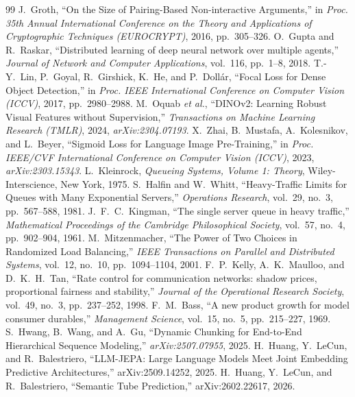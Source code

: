 \documentclass[11pt,a4paper]{article}
\begin{document}
\begin{thebibliography}{99}
 J.~Groth, ``On the Size of Pairing-Based Non-interactive Arguments,'' in \textit{Proc. 35th Annual International Conference on the Theory and Applications of Cryptographic Techniques (EUROCRYPT)}, 2016, pp.~305--326.
 O.~Gupta and R.~Raskar, ``Distributed learning of deep neural network over multiple agents,'' \textit{Journal of Network and Computer Applications}, vol.~116, pp.~1--8, 2018.
 T.-Y.~Lin, P.~Goyal, R.~Girshick, K.~He, and P.~Doll\'ar, ``Focal Loss for Dense Object Detection,'' in \textit{Proc. IEEE International Conference on Computer Vision (ICCV)}, 2017, pp.~2980--2988.
 M.~Oquab \textit{et al.}, ``DINOv2: Learning Robust Visual Features without Supervision,'' \textit{Transactions on Machine Learning Research (TMLR)}, 2024, \textit{arXiv:2304.07193}.
 X.~Zhai, B.~Mustafa, A.~Kolesnikov, and L.~Beyer, ``Sigmoid Loss for Language Image Pre-Training,'' in \textit{Proc. IEEE/CVF International Conference on Computer Vision (ICCV)}, 2023, \textit{arXiv:2303.15343}.
 L.~Kleinrock, \textit{Queueing Systems, Volume 1: Theory}, Wiley-Interscience, New York, 1975.
 S.~Halfin and W.~Whitt, ``Heavy-Traffic Limits for Queues with Many Exponential Servers,'' \textit{Operations Research}, vol.~29, no.~3, pp.~567--588, 1981.
 J.~F.~C.~Kingman, ``The single server queue in heavy traffic,'' \textit{Mathematical Proceedings of the Cambridge Philosophical Society}, vol.~57, no.~4, pp.~902--904, 1961.
 M.~Mitzenmacher, ``The Power of Two Choices in Randomized Load Balancing,'' \textit{IEEE Transactions on Parallel and Distributed Systems}, vol.~12, no.~10, pp.~1094--1104, 2001.
 F.~P.~Kelly, A.~K.~Maulloo, and D.~K.~H.~Tan, ``Rate control for communication networks: shadow prices, proportional fairness and stability,'' \textit{Journal of the Operational Research Society}, vol.~49, no.~3, pp.~237--252, 1998.
 F.~M.~Bass, ``A new product growth for model consumer durables,'' \textit{Management Science}, vol.~15, no.~5, pp.~215--227, 1969.
 S.~Hwang, B.~Wang, and A.~Gu, ``Dynamic Chunking for End-to-End Hierarchical Sequence Modeling,'' \textit{arXiv:2507.07955}, 2025.
 H.~Huang, Y.~LeCun, and R.~Balestriero, ``LLM-JEPA: Large Language Models Meet Joint Embedding Predictive Architectures,'' arXiv:2509.14252, 2025.
 H.~Huang, Y.~LeCun, and R.~Balestriero, ``Semantic Tube Prediction,'' arXiv:2602.22617, 2026.

\end{thebibliography}
\end{document}
